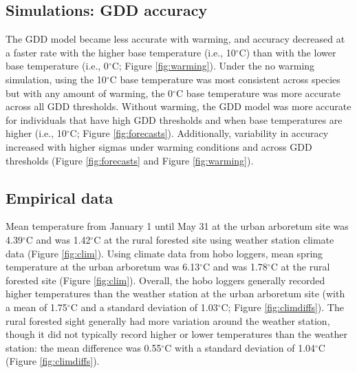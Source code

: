 \documentclass{article}\usepackage[]{graphicx}\usepackage[]{color}
\begin{document}
\subsection*{Simulations: GDD accuracy}
The GDD model became less accurate with warming, and accuracy decreased at a faster rate with the higher base temperature (i.e., 10$^{\circ}$C) than with the lower base temperature (i.e., 0$^{\circ}$C; Figure \ref{fig:warming}). Under the no warming simulation, using the 10$^{\circ}$C base temperature was most consistent across species but with any amount of warming, the 0$^{\circ}$C base temperature was more accurate across all GDD thresholds. Without warming, the GDD model was more accurate for individuals that have high GDD thresholds and when base temperatures are higher (i.e., 10$^{\circ}$C; Figure \ref{fig:forecasts}). Additionally, variability in accuracy increased with higher sigmas under warming conditions and across GDD thresholds (Figure \ref{fig:forecasts} and Figure \ref{fig:warming}).

\subsection*{Empirical data} 
Mean temperature from January 1 until May 31 at the urban arboretum site was 4.39$^{\circ}$C and was 1.42$^{\circ}$C at the rural forested site using weather station climate data (Figure \ref{fig:clim}). Using climate data from hobo loggers, mean spring temperature at the urban arboretum was 6.13$^{\circ}$C and was 1.78$^{\circ}$C at the rural forested site (Figure \ref{fig:clim}). Overall, the hobo loggers generally recorded higher temperatures than the weather station at the urban arboretum site (with a mean of 1.75$^{\circ}$C and a standard deviation of 1.03$^{\circ}$C; Figure \ref{fig:climdiffs}). The rural forested sight generally had more variation around the weather station, though it did not typically record higher or lower temperatures than the weather station: the mean difference was 0.55$^{\circ}$C with a standard deviation of 1.04$^{\circ}$C (Figure \ref{fig:climdiffs}).
\end{document}
